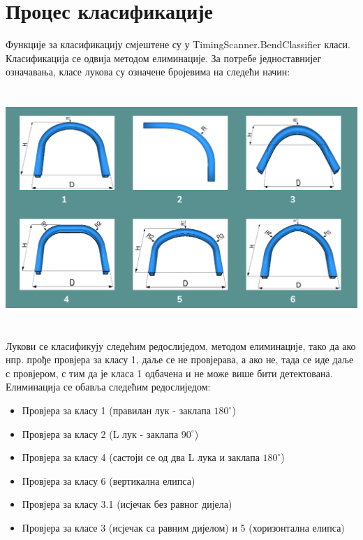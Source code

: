 \documentclass[12pt]{article}
\begin{document}
\section{Процес класификације}
Функције за класификацију смјештене су у TimingScanner.BendClassifier класи. Класификација се одвија методом елиминације. За потребе једноставнијег означавања, класе лукова су означене бројевима на следећи начин:
\vspace{0.5cm}
\begin{center}
    \centering 
    \includegraphics[height=9cm, width=15cm]{images/klase.png}
\end{center}
\vspace{0.5cm}
Лукови се класификују следећим редослиједом, методом елиминације, тако да ако нпр. прође провјера за класу 1, даље се не провјерава, а ако не, тада се иде даље с провјером, с тим да је класа 1 одбачена и не може више бити детектована. Елиминација се обавља следећим редослиједом:
\begin{itemize}
    \item Провјера за класу 1 (правилан лук - заклапа $180^\circ$)
    \item Провјера за класу 2 (L лук - заклапа $90^\circ$)
    \item Провјера за класу 4 (састоји се од два L лука и заклапа $180^\circ$)
    \item Провјера за класу 6 (вертикална елипса)
    \item Провјера за класу 3.1 (исјечак без равног дијела)
    \item Провјера за класе 3 (исјечак са равним дијелом) и 5 (хоризонтална елипса)
\end{itemize}
\end{document}
